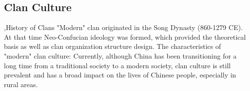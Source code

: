 \documentclass[12pt]{report}
\begin{document}
\subsection{Clan Culture}

\sep{History of Clans}
"Modern" clan originated in the Song Dynasty (860-1279 CE). At that time Neo-Confucian ideology was formed,
which provided the theoretical basis as well as clan organization structure design. The characteristics
of "modern" clan culture:
Currently, although China has been transitioning for a long time from a traditional society to a modern society, clan culture is still
prevalent and has a broad impact on the lives of Chinese people, especially in rural areas.
\end{document}
